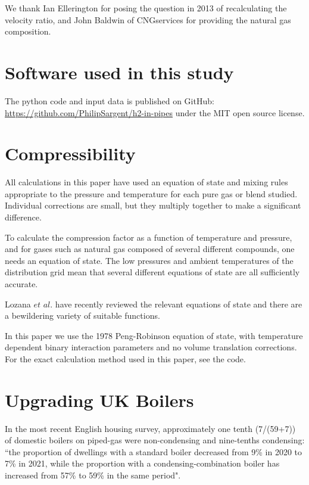 \documentclass[5p]{elsarticle} %
\begin{document}
We thank Ian Ellerington for posing the question in 2013 of recalculating the velocity ratio, and John Baldwin of CNGservices for providing the natural gas composition.

\appendix

\section{Software used in this study}
\label{sec:oursoftware}

The python code and input data is published on GitHub: \url{https://github.com/PhilipSargent/h2-in-pipes} under the MIT open source license\citep{Sargents_github}.

\section{Compressibility}
\label{appendix:gasprops}

All calculations in this paper have used an equation of state and  mixing rules appropriate to the pressure and temperature for each pure gas or blend studied. Individual corrections are small, but they multiply together to make a significant difference.

To calculate the compression factor as a function of temperature and pressure, and for gases such as natural gas composed of several different compounds, one needs an equation of state.
The low pressures and ambient temperatures of the distribution grid mean that several different equations of state are all sufficiently accurate.

Lozana $et$ $al.$ have recently reviewed\citep{Lozana2022}  the relevant equations of state and there are a bewildering variety of suitable functions.

 In this paper we use the 1978 Peng-Robinson equation of state\citep{Tabkhi2008, Abbas2021}, with temperature dependent binary interaction parameters and no volume translation corrections.
 For the exact calculation method used in this paper, see the code\citep{Sargents_github}. 

\section{Upgrading UK Boilers}
\label{appendix:more-boilers}

In the most recent English housing survey\citep{ehs21}, approximately one tenth (7/(59+7)) of domestic boilers on piped-gas were non-condensing and nine-tenths condensing: 
``the proportion of dwellings with a standard boiler decreased from 9\% in 2020 to 7\% in 2021, while the proportion with a condensing-combination boiler has increased from 57\% to 59\% in the same period".
\end{document}
